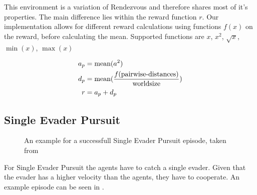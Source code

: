This environment is a variation of Rendezvous and therefore shares most of it's properties. The main difference lies within the reward function $r$. Our implementation allows for different reward calculations using functions $f(x)$ on the reward, before calculating the mean. Supported functions are $x$, $x^2$, $\sqrt{x}$, $\min(x)$, $\max(x)$

\begin{equation}
    \begin{aligned}
        a_p &= \textup{mean}(a^2)\\
        d_p &= \textup{mean}(\frac{f(\textup{pairwise-distances})}{\textup{worldsize}}) \\
        r &= a_p + d_p
    \end{aligned}
    \nonumber
\end{equation}



\subsection{Single Evader Pursuit}
\label{sec:Single Evader Pursuit}


\begin{figure}[htp]
    \centering
    \hspace{1cm}                       
    \caption{An example for a successfull Single Evader Pursuit episode, taken from \citet{KIT2019Max}}
    \label{fig:single_evader_example}
\end{figure}

For Single Evader Pursuit the agents have to catch a single evader. Given that the evader has a higher velocity than the agents, they have to cooperate. An example episode can be seen in .\par

